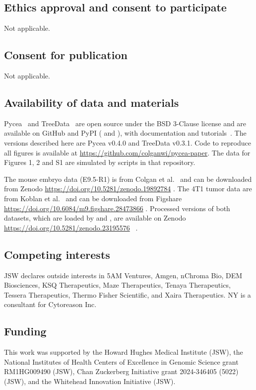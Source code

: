 \subsection*{Ethics approval and consent to participate}
Not applicable.

\subsection*{Consent for publication}
Not applicable.

\subsection*{Availability of data and materials}
Pycea~\citep{pycea_github} and TreeData~\citep{treedata_github} are open source under the BSD 3-Clause license and are available on GitHub and PyPI ( and ), with documentation and tutorials~\citep{pycea_docs}. The versions described here are Pycea v0.4.0 and TreeData v0.3.1. Code to reproduce all figures is available at \url{https://github.com/colganwi/pycea-paper}. The data for Figures 1, 2 and S1 are simulated by scripts in that repository.

The mouse embryo data (E9.5-R1) is from Colgan et al.~\citep{colgan2026} and can be downloaded from Zenodo \url{https://doi.org/10.5281/zenodo.19892784} \citep{data_colgan_zenodo}. The 4T1 tumor data are from Koblan et al.~\citep{koblan2025} and can be downloaded from Figshare \url{https://doi.org/10.6084/m9.figshare.28473866} \citep{data_koblan_figshare}. Processed versions of both datasets, which are loaded by  and , are available on Zenodo \url{https://doi.org/10.5281/zenodo.23195576} ~\citep{data_pycea_zenodo}.

\subsection*{Competing interests}
JSW declares outside interests in 5AM Ventures, Amgen, nChroma Bio, DEM Biosciences, KSQ Therapeutics, Maze Therapeutics, Tenaya Therapeutics, Tessera Therapeutics, Thermo Fisher Scientific, and Xaira Therapeutics. NY is a consultant for Cytoreason Inc.

\subsection*{Funding}
This work was supported by the Howard Hughes Medical Institute (JSW), the National Institutes of Health Centers of Excellence in Genomic Science grant RM1HG009490 (JSW), Chan Zuckerberg Initiative grant 2024-346405 (5022) (JSW), and the Whitehead Innovation Initiative (JSW).

